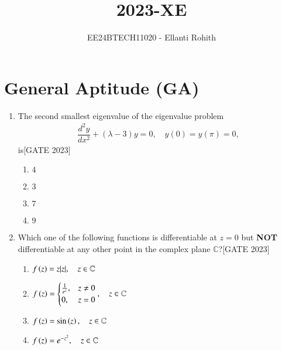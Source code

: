 \documentclass[journal,12pt,onecolumn]{IEEEtran}
\theoremstyle{remark}
\begin{document}

\vspace{3cm}

\title{2023-XE}
\author{EE24BTECH11020 -  Ellanti Rohith}
\maketitle

\renewcommand{\thefigure}{\theenumi}
\renewcommand{\thetable}{\theenumi}
\section*{General Aptitude (GA)}




\begin{enumerate}
    \item The second smallest eigenvalue of the eigenvalue problem
    \begin{align*}
    \dfrac{d^2 y}{dx^2} + (\lambda - 3)y = 0, \quad y(0) = y(\pi) = 0,
    \end{align*}
    is\hfill{[GATE 2023]}
    \begin{multicols}{4}
    \begin{enumerate}
        \item $4$
        \item $3$
        \item $7$
        \item $9$
    \end{enumerate}
    \end{multicols}

    \item Which one of the following functions is differentiable at $z = 0$ but \textbf{NOT} differentiable at any other point in the complex plane $\mathbb{C}$?\hfill{[GATE 2023]}
    \begin{multicols}{2}
    \begin{enumerate}
        \item $f\left(z\right) = z |z|, \quad z \in \mathbb{C}$
        
        \item $f\left(z\right) = \begin{cases} \frac{1}{e^z}, & z \neq 0 \\ 0, & z = 0 \end{cases}, \quad z \in \mathbb{C}$\item $f\left(z\right) = \sin\left(z\right), \quad z \in \mathbb{C}$
        \item $f\left(z\right) = e^{-z^2}, \quad z \in \mathbb{C}$
    \end{enumerate}
    \end{multicols}


\end{enumerate}
\end{document}
